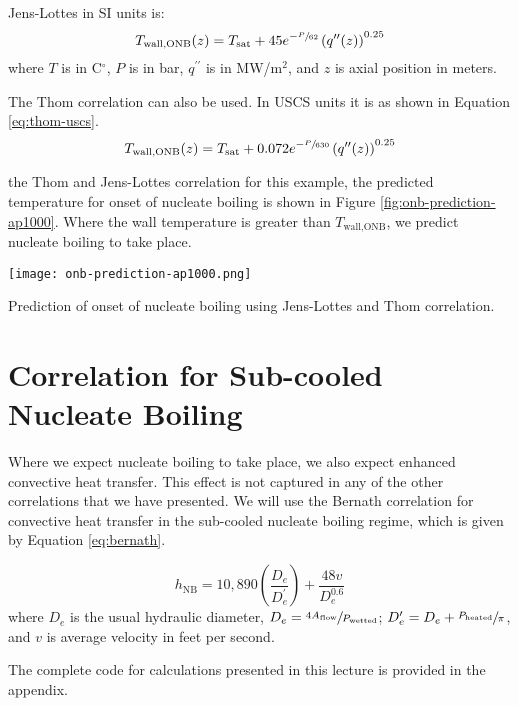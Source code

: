 Jens-Lottes in SI units is: 
\begin{equation}
T_{\text{wall,ONB}}(z) = T_{\text{sat}}+45e^{-\sfrac{P}{62}}\left(q^{\prime \prime}(z) \right)^{0.25}
\label{eq:jens-lottes-si}
\end{equation}
where $T$ is in C$^{\circ}$, $P$ is in bar, $q^{\prime \prime}$ is in MW/m$^{2}$, and $z$ is axial position in meters.

The Thom correlation can also be used. In USCS units it is as shown in Equation \ref{eq:thom-uscs}.
\begin{equation}
T_{\text{wall,ONB}}(z) = T_{\text{sat}}+0.072e^{-\sfrac{P}{630}}\left(q^{\prime \prime}(z) \right)^{0.25}
\label{eq:thom-uscs}
\end{equation}

 the Thom and Jens-Lottes correlation for this example, the predicted temperature for onset of nucleate boiling is shown in Figure \ref{fig:onb-prediction-ap1000}.  Where the wall temperature is greater than $T_{\text{wall,ONB}}$, we predict nucleate boiling to take place.
\begin{marginfigure}
\texttt{[image: onb-prediction-ap1000.png]}
\caption{Prediction of onset of nucleate boiling using Jens-Lottes and Thom correlation.}
\label{fig:onb-prediction-ap1000}
\end{marginfigure}

\section{Correlation for Sub-cooled Nucleate Boiling}
Where we expect nucleate boiling to take place, we also expect enhanced convective heat transfer.  This effect is not captured in any of the other correlations that we have presented. We will use the Bernath correlation for convective heat transfer in the sub-cooled nucleate boiling regime, which is given by Equation \ref{eq:bernath}.

\begin{equation}
h_{\text{NB}} = 10,890\left(\frac{D_e}{D_e^{\prime}} \right) + \frac{48v}{D_e^{0.6}}
\label{eq:bernath}
\end{equation}
where $D_e$ is the usual hydraulic diameter, $D_e = \sfrac{4 A_{\text{flow}}}{P_{\text{wetted}}}$; $D_e^{\prime} = D_e + \sfrac{P_{\text{heated}}}{\pi}$, and $v$ is average velocity in feet per second.

The complete code for calculations presented in this lecture is provided in the appendix.

